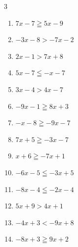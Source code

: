\begin{multicols}{3}
\begin{enumerate}
  \item $7x-7\geqq 5x-9$

        \phantom{$\displaystyle x\geqq -1$}

  \item $-3x-8>-7x-2$


  \item $2x-1>7x+8$


  \item $5x-7\leqq -x-7$

        \phantom{$\displaystyle x\leqq 0$}

  \item $3x-4>4x-7$

        \phantom{$\displaystyle x<3$}

  \item $-9x-1\geqq 8x+3$


  \item $-x-8\geqq -9x-7$


  \item $7x+5\geqq -3x-7$


\columnbreak %

  \item $x+6\geqq -7x+1$


  \item $-6x-5\leqq -3x+5$


  \item $-8x-4\leqq -2x-4$

        \phantom{$\displaystyle x\geqq 0$}

  \item $5x+9>4x+1$

        \phantom{$\displaystyle x>-8$}

  \item $-4x+3<-9x+8$

        \phantom{$\displaystyle x<1$}

  \item $-8x+3\geqq 9x+2$


\end{enumerate}
\end{multicols}
